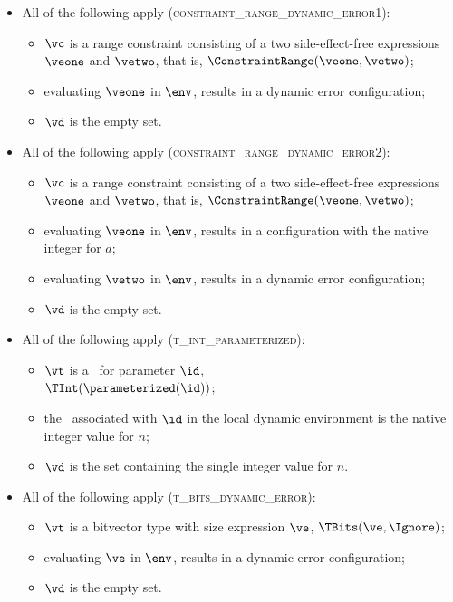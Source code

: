 \begin{itemize}
  \item All of the following apply (\textsc{constraint\_range\_dynamic\_error1}):
  \begin{itemize}
    \item $\vc$ is a range constraint consisting of a two side-effect-free expressions $\veone$ and $\vetwo$, that is, $\ConstraintRange(\veone, \vetwo)$;
    \item evaluating $\veone$ in $\env$, results in a dynamic error configuration;
    \item $\vd$ is the empty set.
  \end{itemize}

  \item All of the following apply (\textsc{constraint\_range\_dynamic\_error2}):
  \begin{itemize}
    \item $\vc$ is a range constraint consisting of a two side-effect-free expressions $\veone$ and $\vetwo$, that is, $\ConstraintRange(\veone, \vetwo)$;
    \item evaluating $\veone$ in $\env$, results in a configuration with the native integer for $a$;
    \item evaluating $\vetwo$ in $\env$, results in a dynamic error configuration;
    \item $\vd$ is the empty set.
  \end{itemize}

  \item All of the following apply (\textsc{t\_int\_parameterized}):
  \begin{itemize}
    \item $\vt$ is a \parameterizedintegertype\ for parameter $\id$, \\ $\TInt(\parameterized(\id))$;
    \item the \nativevalue\ associated with $\id$ in the local dynamic environment is the native integer value for $n$;
    \item $\vd$ is the set containing the single integer value for $n$.
  \end{itemize}

  \item All of the following apply (\textsc{t\_bits\_dynamic\_error}):
  \begin{itemize}
    \item $\vt$ is a bitvector type with size expression $\ve$, $\TBits(\ve, \Ignore)$;
    \item evaluating $\ve$ in $\env$, results in a dynamic error configuration;
    \item $\vd$ is the empty set.
  \end{itemize}


\end{itemize}
